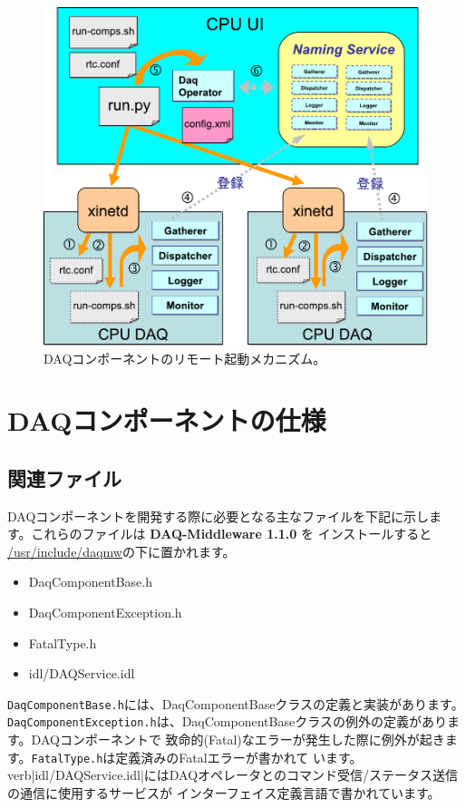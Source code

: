 \documentclass[a4j,10pt,dvips,onecolumn,oneside,final]{jarticle}%
\newcommand {\daqmwcurrent} {
	{\bf DAQ-Middleware 1.1.0}
}
\begin{document}
\begin{figure}[t]
  \centering
  \includegraphics[scale=0.7]{boot.pdf}
  \caption{DAQコンポーネントのリモート起動メカニズム。}
  \label{remote-booting.fig}
\end{figure}


\section{DAQコンポーネントの仕様}\label{daqcomp}
\subsection{関連ファイル}
DAQコンポーネントを開発する際に必要となる主なファイルを下記に示します。これらのファイルは\daqmwcurrent を
インストールすると \url{/usr/include/daqmw}の下に置かれます。
\begin{itemize}
\item DaqComponentBase.h
\item DaqComponentException.h
\item FatalType.h
\item idl/DAQService.idl
\end{itemize}
\verb|DaqComponentBase.h|には、DaqComponentBaseクラスの定義と実装があります。
\verb|DaqComponentException.h|は、DaqComponentBaseクラスの例外の定義があります。DAQコンポーネントで
致命的(Fatal)なエラーが発生した際に例外が起きます。\verb|FatalType.h|は定義済みのFatalエラーが書かれて
います。verb|idl/DAQService.idl|にはDAQオペレータとのコマンド受信/ステータス送信の通信に使用するサービスが
インターフェイス定義言語で書かれています。
\end{document}
